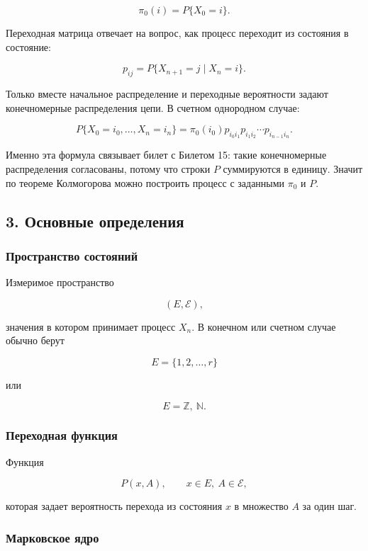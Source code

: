 \documentclass[
  11pt,
  a4paper,
]{article}
\begin{document}
\[
\pi_0(i)=P\{X_0=i\}.
\]

Переходная матрица отвечает на вопрос, как процесс переходит из
состояния в состояние:

\[
p_{ij}=P\{X_{n+1}=j\mid X_n=i\}.
\]

Только вместе начальное распределение и переходные вероятности задают
конечномерные распределения цепи. В счетном однородном случае:

\[
P\{X_0=i_0,\ldots,X_n=i_n\}
=
\pi_0(i_0)p_{i_0i_1}p_{i_1i_2}\cdots p_{i_{n-1}i_n}.
\]

Именно эта формула связывает билет с Билетом 15: такие конечномерные
распределения согласованы, потому что строки \(P\) суммируются в
единицу. Значит по теореме Колмогорова можно построить процесс с
заданными \(\pi_0\) и \(P\).

\subsection{3. Основные
определения}\label{ux43eux441ux43dux43eux432ux43dux44bux435-ux43eux43fux440ux435ux434ux435ux43bux435ux43dux438ux44f}

\subsubsection{Пространство
состояний}\label{ux43fux440ux43eux441ux442ux440ux430ux43dux441ux442ux432ux43e-ux441ux43eux441ux442ux43eux44fux43dux438ux439}

Измеримое пространство

\[
(E,\mathcal E),
\]

значения в котором принимает процесс \(X_n\). В конечном или счетном
случае обычно берут

\[
E=\{1,2,\ldots,r\}
\]

или

\[
E=\mathbb Z,\ \mathbb N.
\]

\subsubsection{Переходная
функция}\label{ux43fux435ux440ux435ux445ux43eux434ux43dux430ux44f-ux444ux443ux43dux43aux446ux438ux44f}

Функция

\[
P(x,A),
\qquad
x\in E,\ A\in\mathcal E,
\]

которая задает вероятность перехода из состояния \(x\) в множество \(A\)
за один шаг.

\subsubsection{Марковское
ядро}\label{ux43cux430ux440ux43aux43eux432ux441ux43aux43eux435-ux44fux434ux440ux43e}
\end{document}
